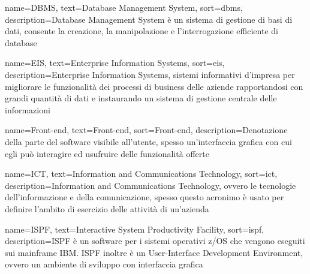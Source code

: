 {
    name=DBMS,
    text=Database Management System,
    sort=dbms,
    description={Database Management System è un sistema di gestione di basi di dati, consente la creazione, la manipolazione e l'interrogazione efficiente di database}
}

{
    name=EIS,
    text=Enterprise Information Systems,
    sort=eis,
    description={Enterprise Information Systems, sistemi informativi d'impresa per migliorare le funzionalità dei processi di business delle aziende rapportandosi con grandi quantità di dati e instaurando un sistema di gestione centrale delle informazioni}
}

{
    name=Front-end,
    text=Front-end,
    sort=Front-end,
    description={Denotazione della parte del software visibile all'utente, spesso un'interfaccia grafica con cui egli può interagire ed usufruire delle funzionalità offerte}
}



{
    name=ICT,
    text=Information and Communications Technology,
    sort=ict,
    description={Information and Communications Technology, ovvero le tecnologie dell’informazione e della comunicazione, spesso questo acronimo è usato per definire l'ambito di esercizio delle attività di un'azienda}
}

{
    name=ISPF,
    text=Interactive System Productivity Facility,
    sort=ispf,
    description={ISPF è un software per i sistemi operativi z/OS che vengono eseguiti sui mainframe IBM. ISPF inoltre è un User-Interface Development Environment, ovvero un ambiente di sviluppo con interfaccia grafica}
}



